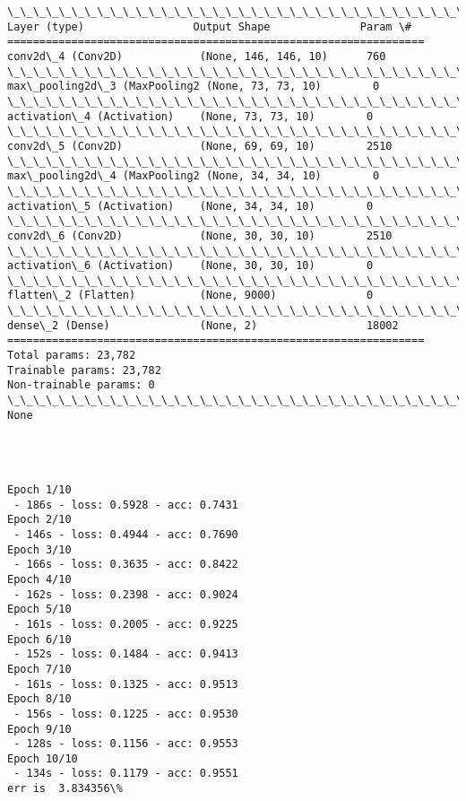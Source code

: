 \documentclass[11pt]{article}
\begin{document}
    \begin{Verbatim}[commandchars=\\\{\}]
\_\_\_\_\_\_\_\_\_\_\_\_\_\_\_\_\_\_\_\_\_\_\_\_\_\_\_\_\_\_\_\_\_\_\_\_\_\_\_\_\_\_\_\_\_\_\_\_\_\_\_\_\_\_\_\_\_\_\_\_\_\_\_\_\_
Layer (type)                 Output Shape              Param \#   
=================================================================
conv2d\_4 (Conv2D)            (None, 146, 146, 10)      760       
\_\_\_\_\_\_\_\_\_\_\_\_\_\_\_\_\_\_\_\_\_\_\_\_\_\_\_\_\_\_\_\_\_\_\_\_\_\_\_\_\_\_\_\_\_\_\_\_\_\_\_\_\_\_\_\_\_\_\_\_\_\_\_\_\_
max\_pooling2d\_3 (MaxPooling2 (None, 73, 73, 10)        0         
\_\_\_\_\_\_\_\_\_\_\_\_\_\_\_\_\_\_\_\_\_\_\_\_\_\_\_\_\_\_\_\_\_\_\_\_\_\_\_\_\_\_\_\_\_\_\_\_\_\_\_\_\_\_\_\_\_\_\_\_\_\_\_\_\_
activation\_4 (Activation)    (None, 73, 73, 10)        0         
\_\_\_\_\_\_\_\_\_\_\_\_\_\_\_\_\_\_\_\_\_\_\_\_\_\_\_\_\_\_\_\_\_\_\_\_\_\_\_\_\_\_\_\_\_\_\_\_\_\_\_\_\_\_\_\_\_\_\_\_\_\_\_\_\_
conv2d\_5 (Conv2D)            (None, 69, 69, 10)        2510      
\_\_\_\_\_\_\_\_\_\_\_\_\_\_\_\_\_\_\_\_\_\_\_\_\_\_\_\_\_\_\_\_\_\_\_\_\_\_\_\_\_\_\_\_\_\_\_\_\_\_\_\_\_\_\_\_\_\_\_\_\_\_\_\_\_
max\_pooling2d\_4 (MaxPooling2 (None, 34, 34, 10)        0         
\_\_\_\_\_\_\_\_\_\_\_\_\_\_\_\_\_\_\_\_\_\_\_\_\_\_\_\_\_\_\_\_\_\_\_\_\_\_\_\_\_\_\_\_\_\_\_\_\_\_\_\_\_\_\_\_\_\_\_\_\_\_\_\_\_
activation\_5 (Activation)    (None, 34, 34, 10)        0         
\_\_\_\_\_\_\_\_\_\_\_\_\_\_\_\_\_\_\_\_\_\_\_\_\_\_\_\_\_\_\_\_\_\_\_\_\_\_\_\_\_\_\_\_\_\_\_\_\_\_\_\_\_\_\_\_\_\_\_\_\_\_\_\_\_
conv2d\_6 (Conv2D)            (None, 30, 30, 10)        2510      
\_\_\_\_\_\_\_\_\_\_\_\_\_\_\_\_\_\_\_\_\_\_\_\_\_\_\_\_\_\_\_\_\_\_\_\_\_\_\_\_\_\_\_\_\_\_\_\_\_\_\_\_\_\_\_\_\_\_\_\_\_\_\_\_\_
activation\_6 (Activation)    (None, 30, 30, 10)        0         
\_\_\_\_\_\_\_\_\_\_\_\_\_\_\_\_\_\_\_\_\_\_\_\_\_\_\_\_\_\_\_\_\_\_\_\_\_\_\_\_\_\_\_\_\_\_\_\_\_\_\_\_\_\_\_\_\_\_\_\_\_\_\_\_\_
flatten\_2 (Flatten)          (None, 9000)              0         
\_\_\_\_\_\_\_\_\_\_\_\_\_\_\_\_\_\_\_\_\_\_\_\_\_\_\_\_\_\_\_\_\_\_\_\_\_\_\_\_\_\_\_\_\_\_\_\_\_\_\_\_\_\_\_\_\_\_\_\_\_\_\_\_\_
dense\_2 (Dense)              (None, 2)                 18002     
=================================================================
Total params: 23,782
Trainable params: 23,782
Non-trainable params: 0
\_\_\_\_\_\_\_\_\_\_\_\_\_\_\_\_\_\_\_\_\_\_\_\_\_\_\_\_\_\_\_\_\_\_\_\_\_\_\_\_\_\_\_\_\_\_\_\_\_\_\_\_\_\_\_\_\_\_\_\_\_\_\_\_\_
None




Epoch 1/10
 - 186s - loss: 0.5928 - acc: 0.7431
Epoch 2/10
 - 146s - loss: 0.4944 - acc: 0.7690
Epoch 3/10
 - 166s - loss: 0.3635 - acc: 0.8422
Epoch 4/10
 - 162s - loss: 0.2398 - acc: 0.9024
Epoch 5/10
 - 161s - loss: 0.2005 - acc: 0.9225
Epoch 6/10
 - 152s - loss: 0.1484 - acc: 0.9413
Epoch 7/10
 - 161s - loss: 0.1325 - acc: 0.9513
Epoch 8/10
 - 156s - loss: 0.1225 - acc: 0.9530
Epoch 9/10
 - 128s - loss: 0.1156 - acc: 0.9553
Epoch 10/10
 - 134s - loss: 0.1179 - acc: 0.9551
err is  3.834356\%

    \end{Verbatim}
\end{document}
